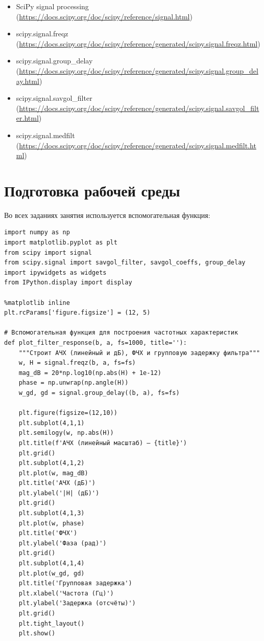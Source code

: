 \documentclass[12pt,a4paper,openany]{book}
\providecommand{\tightlist}{\setlength{\itemsep}{0pt}\setlength{\parskip}{0pt}}
\begin{document}
\begin{itemize}
\tightlist
\item
  SciPy signal processing (\url{https://docs.scipy.org/doc/scipy/reference/signal.html})
\item
  scipy.signal.freqz (\url{https://docs.scipy.org/doc/scipy/reference/generated/scipy.signal.freqz.html})
\item
  scipy.signal.group\_delay (\url{https://docs.scipy.org/doc/scipy/reference/generated/scipy.signal.group_delay.html})
\item
  scipy.signal.savgol\_filter (\url{https://docs.scipy.org/doc/scipy/reference/generated/scipy.signal.savgol_filter.html})
\item
  scipy.signal.medfilt (\url{https://docs.scipy.org/doc/scipy/reference/generated/scipy.signal.medfilt.html})
\end{itemize}

\section*{Подготовка рабочей среды}

Во всех заданиях занятия используется вспомогательная функция:

\begin{Verbatim}[fontsize=\small, breaklines, breakanywhere, frame=single, framesep=2mm]
import numpy as np
import matplotlib.pyplot as plt
from scipy import signal
from scipy.signal import savgol_filter, savgol_coeffs, group_delay
import ipywidgets as widgets
from IPython.display import display

%matplotlib inline
plt.rcParams['figure.figsize'] = (12, 5)

# Вспомогательная функция для построения частотных характеристик
def plot_filter_response(b, a, fs=1000, title=''):
    """Строит АЧХ (линейный и дБ), ФЧХ и групповую задержку фильтра"""
    w, H = signal.freqz(b, a, fs=fs)
    mag_dB = 20*np.log10(np.abs(H) + 1e-12)
    phase = np.unwrap(np.angle(H))
    w_gd, gd = signal.group_delay((b, a), fs=fs)

    plt.figure(figsize=(12,10))
    plt.subplot(4,1,1)
    plt.semilogy(w, np.abs(H))
    plt.title(f'АЧХ (линейный масштаб) – {title}')
    plt.grid()
    plt.subplot(4,1,2)
    plt.plot(w, mag_dB)
    plt.title('АЧХ (дБ)')
    plt.ylabel('|H| (дБ)')
    plt.grid()
    plt.subplot(4,1,3)
    plt.plot(w, phase)
    plt.title('ФЧХ')
    plt.ylabel('Фаза (рад)')
    plt.grid()
    plt.subplot(4,1,4)
    plt.plot(w_gd, gd)
    plt.title('Групповая задержка')
    plt.xlabel('Частота (Гц)')
    plt.ylabel('Задержка (отсчёты)')
    plt.grid()
    plt.tight_layout()
    plt.show()
\end{Verbatim}
\end{document}
